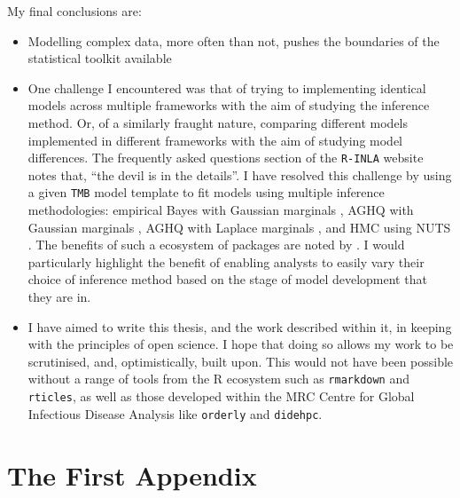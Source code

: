 \documentclass[a4paper, nobind]{templates/ociamthesis}
\providecommand{\tightlist}{%
  \setlength{\itemsep}{0pt}\setlength{\parskip}{0pt}}
\newcommand*{\bibtitle}{Works Cited}
\begin{document}
My final conclusions are:

\begin{itemize}
\tightlist
\item
  Modelling complex data, more often than not, pushes the boundaries of the statistical toolkit available
\item
  One challenge I encountered was that of trying to implementing identical models across multiple frameworks with the aim of studying the inference method. Or, of a similarly fraught nature, comparing different models implemented in different frameworks with the aim of studying model differences. The frequently asked questions section of the \texttt{R-INLA} website \autocite{rinla2023faq} notes that, ``the devil is in the details''. I have resolved this challenge by using a given \texttt{TMB} model template to fit models using multiple inference methodologies: empirical Bayes with Gaussian marginals \autocite{kristensen2016tmb}, AGHQ with Gaussian marginals \autocite{stringer2021implementing}, AGHQ with Laplace marginals \autocite{howes2023integrated}, and HMC using NUTS \autocite{monnahan2018no}. The benefits of such a ecosystem of packages are noted by \textcite{stringer2021fields}. I would particularly highlight the benefit of enabling analysts to easily vary their choice of inference method based on the stage of model development that they are in.
\item
  I have aimed to write this thesis, and the work described within it, in keeping with the principles of open science. I hope that doing so allows my work to be scrutinised, and, optimistically, built upon. This would not have been possible without a range of tools from the R ecosystem such as \texttt{rmarkdown} and \texttt{rticles}, as well as those developed within the MRC Centre for Global Infectious Disease Analysis like \texttt{orderly} and \texttt{didehpc}.
\end{itemize}

\startappendices

\hypertarget{the-first-appendix}{%
\chapter{The First Appendix}\label{the-first-appendix}}




\setlength{\baselineskip}{0pt} %

{\renewcommand*\MakeUppercase[1]{#1}%
\printbibliography[heading=bibintoc,title={\bibtitle}]}
\end{document}
